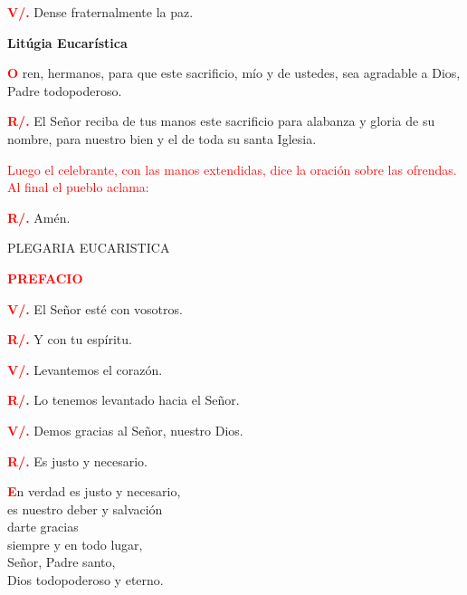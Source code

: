 \documentclass[12pt, letterpaper]{report}
\begin{document}
\Large {\bfseries \textcolor{red}{V/.}} \hspace{0.5cm} Dense fraternalmente la paz. 

\newpage

\begin{center}
\Huge {\bfseries Lit\'ugia Eucar\'istica}
\end{center}

\lettrine[lines=1]{\bfseries \textcolor{red}{O}}{} \Large ren, hermanos, para que este sacrificio, m\'io y de ustedes, sea agradable a Dios, Padre todopoderoso. 

\Large {\bfseries \textcolor{red}{R/.}} \hspace{0.5cm} El Se\~nor reciba de tus manos este sacrificio para alabanza y gloria de su nombre, para nuestro bien y el de toda su santa Iglesia. 

\large {\textcolor{red}{Luego el celebrante, con las manos extendidas, dice la oraci\'on sobre las ofrendas. Al final el
pueblo aclama:}}

\Large {\bfseries \textcolor{red}{R/.}} \hspace{0.5cm} Am\'en.

\begin{center}
\Large PLEGARIA EUCARISTICA
\end{center}


\Large {\bfseries \textcolor{red}{PREFACIO}}

\Large {\bfseries \textcolor{red}{V/.}} \hspace{0.5cm} El Se\~nor est\'e con vosotros.

\Large {\bfseries \textcolor{red}{R/.}} \hspace{0.5cm} Y con tu esp\'iritu. 


\Large {\bfseries \textcolor{red}{V/.}} \hspace{0.5cm} Levantemos el coraz\'on.

\Large {\bfseries \textcolor{red}{R/.}} \hspace{0.5cm} Lo tenemos levantado hacia el Se\~nor. 


\Large {\bfseries \textcolor{red}{V/.}} \hspace{0.5cm} Demos gracias al Se\~nor, nuestro Dios.

\Large {\bfseries \textcolor{red}{R/.}} \hspace{0.5cm} Es justo y necesario.

\newpage

\lettrine[lines=1]{\bfseries \textcolor{red}{E}}{}\Large n verdad es justo y necesario,\\
    es nuestro deber y salvaci\'on\\
    darte gracias\\
    siempre y en todo lugar,\\
    Se\~nor, Padre santo,\\
    Dios todopoderoso y eterno.
\end{document}

